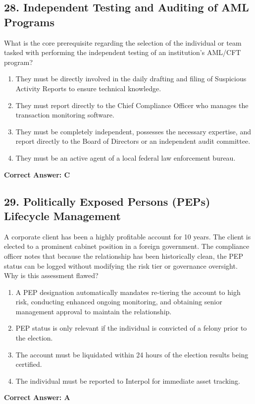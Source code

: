 \documentclass[11pt,a4paper]{article}
\begin{document}
	\subsection{28. Independent Testing and Auditing of AML Programs}
	What is the core prerequisite regarding the selection of the individual or team tasked with performing the independent testing of an institution’s AML/CFT program?
	\begin{enumerate}[label=\Alph*.]
		\item They must be directly involved in the daily drafting and filing of Suspicious Activity Reports to ensure technical knowledge.
		\item They must report directly to the Chief Compliance Officer who manages the transaction monitoring software.
		\item They must be completely independent, possesses the necessary expertise, and report directly to the Board of Directors or an independent audit committee.
		\item They must be an active agent of a local federal law enforcement bureau.
	\end{enumerate}
	\textbf{Correct Answer: C}
	
	\subsection{29. Politically Exposed Persons (PEPs) Lifecycle Management}
	A corporate client has been a highly profitable account for 10 years. The client is elected to a prominent cabinet position in a foreign government. The compliance officer notes that because the relationship has been historically clean, the PEP status can be logged without modifying the risk tier or governance oversight. Why is this assessment flawed?
	\begin{enumerate}[label=\Alph*.]
		\item A PEP designation automatically mandates re-tiering the account to high risk, conducting enhanced ongoing monitoring, and obtaining senior management approval to maintain the relationship.
		\item PEP status is only relevant if the individual is convicted of a felony prior to the election.
		\item The account must be liquidated within 24 hours of the election results being certified.
		\item The individual must be reported to Interpol for immediate asset tracking.
	\end{enumerate}
	\textbf{Correct Answer: A}
	
\end{document}
